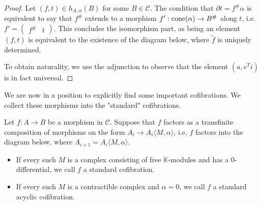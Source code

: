 \documentclass[../thesis.tex]{subfiles}
\begin{document}
            \begin{proof}
                Let $(f,t)\in h_{A,\alpha}(B)$ for some $B\in\mathcal{C}$. The condition that $\partial t = f^\#\alpha$ is equivalent to say that $f^\#$ extends to a morphism $f' : \tt{cone}(\alpha) \rightarrow B^\#$ along $t$, i.e. $f' = \begin{pmatrix}f^\# & t\end{pmatrix}$. This concludes the isomorphism part, as being an element $(f,t)$ is equivalent to the existence of the diagram below, where $\widetilde{f}$ is uniquely determined.
                \begin{center}
                \end{center}
  
                To obtain naturality, we use the adjunction to observe that the element $(a, e^Ti)$ is in fact universal.
            \end{proof}

            We are now in a position to explicitly find some important cofibrations. We collect these morphisms into the "standard" cofibrations.

            \begin{definition}
                Let $f:A\rightarrow B$ be a morphism in $\mathcal{C}$. Suppose that $f$ factors as a transfinite composition of morphisms on the form $A_i \rightarrow A_i\langle M,\alpha\rangle$, i.e. $f$ factors into the diagram below, where $A_{i+1} = A_i\langle M,\alpha\rangle$.
                \begin{center}
                \end{center}
                \begin{itemize}
                    \item If every such $M$ is a complex consisting of free $\mathbb{K}$-modules and has a $0$-differential, we call $f$ a standard cofibration.
                    \item If every such $M$ is a contractible complex and $\alpha = 0$, we call $f$ a standard acyclic cofibration.
                \end{itemize}
            \end{definition}
\end{document}
